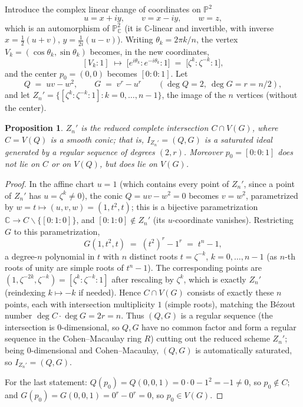 \documentclass[11pt]{amsart}
\theoremstyle{plain}
\newtheorem{proposition}[theorem]{Proposition}
\theoremstyle{definition}
\newcommand{\PP}{\mathbb{P}}
\newcommand{\CC}{\mathbb{C}}
\begin{document}
Introduce the complex linear change of coordinates on $\PP^2$
\[
u = x+iy,\qquad v = x-iy, \qquad w=z,
\]
which is an automorphism of $\PP^2_\CC$ (it is $\CC$-linear and invertible, with inverse $x=\tfrac12(u+v)$, $y=\tfrac1{2i}(u-v)$). Writing $\theta_k=2\pi k/n$, the vertex $V_k=(\cos\theta_k,\sin\theta_k)$ becomes, in the new coordinates,
\[
[V_k:1] \;\longmapsto\; \big[e^{i\theta_k} : e^{-i\theta_k} : 1\big] \;=\; \big[\zeta^{k} : \zeta^{-k} : 1\big],
\]
and the center $p_0=(0,0)$ becomes $[0:0:1]$. Let
\[
Q \;=\; uv-w^2, \qquad G \;=\; v^r-u^r \qquad (\deg Q=2,\ \deg G = r=n/2),
\]
and let $Z_n'=\{[\zeta^k:\zeta^{-k}:1] : k=0,\dots,n-1\}$, the image of the $n$ vertices (without the center).

\begin{proposition}\label{prop:CI}
$Z_n'$ is the reduced complete intersection $C\cap V(G)$, where $C=V(Q)$ is a smooth conic; that is, $I_{Z_n'}=(Q,G)$ is a saturated ideal generated by a regular sequence of degrees $(2,r)$. Moreover $p_0=[0:0:1]$ does not lie on $C$ or on $V(Q)$, but does lie on $V(G)$.
\end{proposition}

\begin{proof}
In the affine chart $u=1$ (which contains every point of $Z_n'$, since a point of $Z_n'$ has $u=\zeta^k\ne0$), the conic $Q=uv-w^2=0$ becomes $v=w^2$, parametrized by $w=t\mapsto (u,v,w)=(1,t^2,t)$; this is a bijective parametrization $\CC\to C\smallsetminus\{[0:1:0]\}$, and $[0:1:0]\notin Z_n'$ (its $u$-coordinate vanishes). Restricting $G$ to this parametrization,
\[
G(1,t^2,t) \;=\; (t^2)^r - 1^r \;=\; t^{n}-1,
\]
a degree-$n$ polynomial in $t$ with $n$ distinct roots $t=\zeta^{-k}$, $k=0,\dots,n-1$ (as $n$-th roots of unity are simple roots of $t^n-1$). The corresponding points are $(1,\zeta^{-2k},\zeta^{-k})=[\zeta^{k}:\zeta^{-k}:1]$ after rescaling by $\zeta^{k}$, which is exactly $Z_n'$ (reindexing $k\mapsto -k$ if needed). Hence $C\cap V(G)$ consists of exactly these $n$ points, each with intersection multiplicity $1$ (simple roots), matching the B\'ezout number $\deg C\cdot \deg G = 2r=n$. Thus $(Q,G)$ is a regular sequence (the intersection is $0$-dimensional, so $Q,G$ have no common factor and form a regular sequence in the Cohen--Macaulay ring $R$) cutting out the reduced scheme $Z_n'$; being $0$-dimensional and Cohen--Macaulay, $(Q,G)$ is automatically saturated, so $I_{Z_n'}=(Q,G)$.

For the last statement: $Q(p_0)=Q(0,0,1)=0\cdot0-1^2=-1\ne0$, so $p_0\notin C$; and $G(p_0)=G(0,0,1)=0^r-0^r=0$, so $p_0\in V(G)$.
\end{proof}
\end{document}
